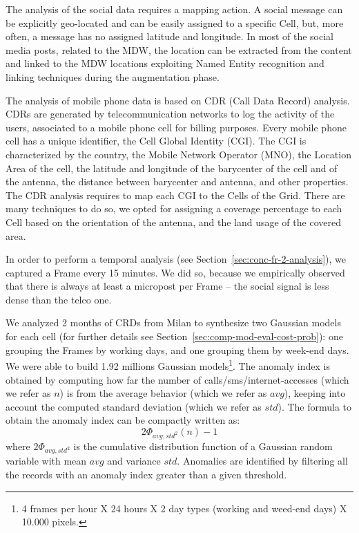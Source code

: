 The analysis of the social data requires a mapping action. A social message can be explicitly geo-located and can be easily assigned to a specific \textsf{Cell}, but, more often, a message has no assigned latitude and longitude. In most of the social media posts, related to the MDW, the location can be extracted from the content and linked to the MDW locations exploiting Named Entity recognition and linking techniques during the augmentation phase.

The analysis of mobile phone data is based on CDR (Call Data Record) analysis. CDRs are generated by telecommunication networks to log the activity of the users, associated to a mobile phone cell for billing purposes. Every mobile phone cell has a unique identifier, the Cell Global Identity (CGI). The CGI is characterized by the country, the Mobile Network Operator (MNO), the Location Area of the cell, the latitude and longitude of the barycenter of the cell and of the antenna, the distance between barycenter and antenna, and other properties.
The CDR analysis requires to map each CGI to the \textsf{Cell}s of the \textsf{Grid}.
There are many techniques to do so, we opted for assigning a coverage percentage to each \textsf{Cell} based on the orientation of the antenna, and the land usage of the covered area.

In order to perform a temporal analysis (see Section~\ref{sec:conc-fr-2-analysis}), we captured a \textsf{Frame} every 15 minutes. We did so, because we empirically observed that there is always at least a micropost per \textsf{Frame} -- the social signal is less dense than the telco one.

We analyzed 2 months of CRDs from Milan to synthesize two Gaussian models for each cell (for further details see Section~\ref{sec:comp-mod-eval-cost-prob}): one grouping the \textsf{Frame}s by working days, and one grouping them by week-end days. We were able to build 1.92 millions Gaussian models\footnote{4 frames per hour X 24 hours X 2 day types (working and weed-end days) X 10.000 pixels.}.
The anomaly index is obtained by computing how far the number of calls/sms/internet-accesses (which we refer as $n$) is from the average behavior (which we refer as $avg$), keeping into account the computed
standard deviation (which we refer as $std$). The formula to obtain the anomaly index can be compactly written as:
\[
2\Phi_{avg,std^2} (n) - 1
\]
where $ 2\Phi_{avg,std^2} $ is the cumulative distribution function of a Gaussian random variable with mean $avg$ and variance $std$.
Anomalies are identified by filtering all the records with an anomaly index greater than a given threshold.

